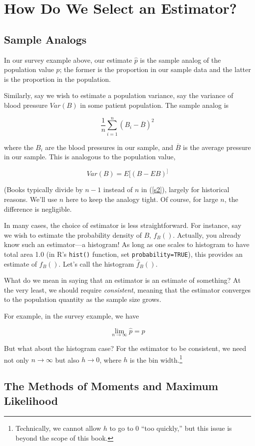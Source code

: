 \section{How Do We Select an Estimator?}

\subsection{Sample Analogs}

In our survey example above, our estimate $\widehat{p}$ is the sample
analog of the population value $p$; the former is the proportion in our
sample data and the latter is the proportion in the population.

Similarly, say we wish to estimate a population variance, say the
variance of blood pressure $Var(B)$ in some patient population.  The
sample analog is

\begin{equation}
\label{s2}
\frac{1}{n} \sum_{i=1}^n (B_i - \overline{B})^2
\end{equation}

where the $B_i$ are the blood pressures in our sample, and $\overline{B}$
is the average pressure in our sample.  This is analogous to the
population value,

\begin{equation}
Var(B) = E[(B - EB)^]
\end{equation}

(Books typically divide by $n-1$ instead of $n$ in (\ref{s2}), largely
for historical reasons.  We'll use $n$ here to keep the analogy tight.
Of course, for large $n$, the difference is negligible.

In many cases, the choice of estimator is less straightforward.  For
instance, say we wish to estimate the probability density of $B$, 
$f_B()$.  Actually, you already know such an estimator---a histogram!
As long as one scales to histogram to have total area 1.0 (in R's
\lstinline{hist()} function, set \lstinline{probability=TRUE}), this
provides an estimate of $f_B()$.  Let's call the histogram
$\widehat{f}_B()$.

What do we mean in saying that an estimator is an estimate of something?
At the very least, we should require \textit{consistent}, meaning that
the estimator converges to the population quantity as the sample size
grows.

For example, in the survey example, we have 

\begin{equation}
\lim_{n \rightarrow \infty} \widehat{p} = p
\end{equation}

But what about the histogram case?  For the estimator to be consistent,
we need not only $n \rightarrow \infty$ but also $h \rightarrow 0$,
where $h$ is the bin width.\footnote{Technically, we cannot allow $h$
to go to 0 ``too quickly,'' but this issue is beyond the scope of this
book.}

\subsection{The Methods of Moments and Maximum Likelihood}
